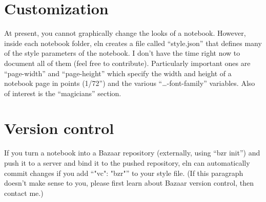 \documentclass[11pt]{report}
\begin{document}
\section{Customization}

At present, you cannot graphically change the looks of a
notebook. However, inside each notebook folder, eln creates a file
called ``style.json'' that defines many of the style parameters of the
notebook. I don't have the time right now to document all of them
(feel free to contribute). Particularly important ones are
``page-width'' and ``page-height'' which specify the width and height
of a notebook page in points (1/72'') and the various
``\ldots-font-family'' variables. Also of interest is the
``magicians'' section.

\section{Version control}

If you turn a notebook into a Bazaar repository (externally, using
``bzr init'') and push it to a server and bind it to the pushed
repository, eln can automatically commit changes if you add ``"vc":
"bzr"'' to your style file. (If this paragraph doesn't make sense to
you, please first learn about Bazaar version control, then contact
me.)
\end{document}
